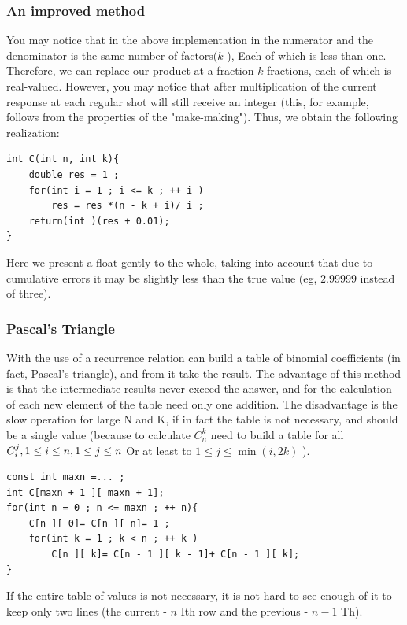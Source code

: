 \subsubsection{ An improved method }

You may notice that in the above implementation in the numerator and the denominator is the same number of factors($k$ ), Each of which is less than one. Therefore, we can replace our product at a fraction $k$ fractions, each of which is real-valued. However, you may notice that after multiplication of the current response at each regular shot will still receive an integer (this, for example, follows from the properties of the "make-making"). Thus, we obtain the following realization:

\begin{verbatim}
int C(int n, int k){
    double res = 1 ;
    for(int i = 1 ; i <= k ; ++ i )
        res = res *(n - k + i)/ i ;
    return(int )(res + 0.01);
} 
\end{verbatim}
Here we present a float gently to the whole, taking into account that due to cumulative errors it may be slightly less than the true value (eg, $2.99999$ instead of three).

\subsubsection{ Pascal's Triangle }

With the use of a recurrence relation can build a table of binomial coefficients (in fact, Pascal's triangle), and from it take the result. The advantage of this method is that the intermediate results never exceed the answer, and for the calculation of each new element of the table need only one addition. The disadvantage is the slow operation for large N and K, if in fact the table is not necessary, and should be a single value (because to calculate $C_n ^ k$ need to build a table for all $C_i ^ j, \\1 \le i \le n, \\1 \le j \le n$ Or at least to $1 \le j \le \min (i, 2k)$ ).

\begin{verbatim}
const int maxn =... ;
int C[maxn + 1 ][ maxn + 1];
for(int n = 0 ; n <= maxn ; ++ n){
    C[n ][ 0]= C[n ][ n]= 1 ;
    for(int k = 1 ; k < n ; ++ k )
        C[n ][ k]= C[n - 1 ][ k - 1]+ C[n - 1 ][ k];
} 
\end{verbatim}
If the entire table of values ​​is not necessary, it is not hard to see enough of it to keep only two lines (the current - $n$ Ith row and the previous - $n-1$ Th).

